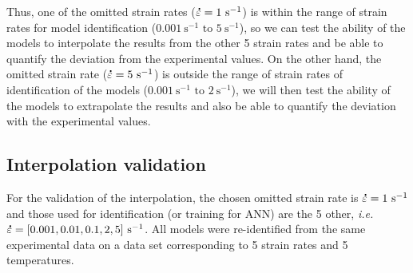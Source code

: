 \documentclass[twoside,english,1p,final,sort&compress]{elsarticle}
\makeatletter
\theoremstyle{plain}
\DeclareRobustCommand{\mdot}[1]{\accentset{\mbox{\bfseries .}}{#1}}
\DeclareRobustCommand{\ie}{\emph{i.e.}\@\xspace}
\DeclareRobustCommand{\ps}{\text{s}^{-1}}
\makeatother
\begin{document}
Thus, one of the omitted strain rates ($\mdot\varepsilon=1~\ps$) is within the range of strain rates for model identification ($0.001~\ps\text{ to }5~\ps$), so we can test the ability of the models to interpolate the results from the other 5 strain rates and be able to quantify the deviation from the experimental values.
On the other hand, the omitted strain rate ($\mdot\varepsilon=5~\ps$) is outside the range of strain rates of identification of the models ($0.001~\ps\text{ to }2~\ps$), we will then test the ability of the models to extrapolate the results and also be able to quantify the deviation with the experimental values.

\subsection{Interpolation validation}

For the validation of the interpolation, the chosen omitted strain rate is $\mdot\varepsilon=1~\ps$ and those used for identification (or training for ANN) are the 5 other, \ie $\mdot\varepsilon=[0.001, 0.01, 0.1, 2, 5]~\ps$.
All models were re-identified from the same experimental data on a data set corresponding to 5 strain rates and 5 temperatures.
\end{document}
